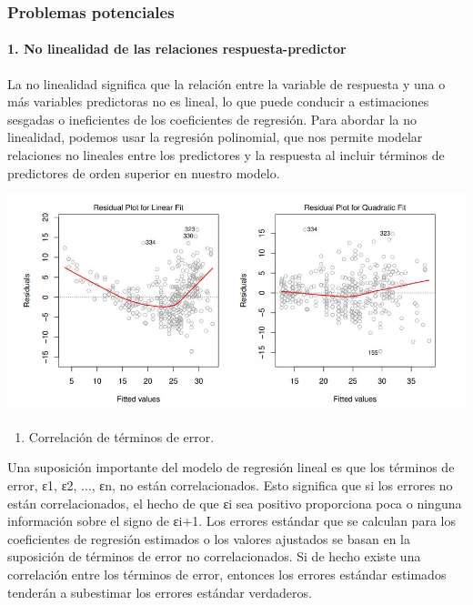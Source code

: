 \documentclass[
  letterpaper,
  DIV=11,
  numbers=noendperiod]{scrartcl}
\let\oldparagraph\paragraph
\renewcommand{\paragraph}[1]{\oldparagraph{#1}\mbox{}}
\providecommand{\tightlist}{%
  \setlength{\itemsep}{0pt}\setlength{\parskip}{0pt}}\usepackage{longtable,booktabs,array}
\begin{document}
\hypertarget{problemas-potenciales}{%
\subsubsection{Problemas potenciales}\label{problemas-potenciales}}

\hypertarget{no-linealidad-de-las-relaciones-respuesta-predictor}{%
\paragraph{1. No linealidad de las relaciones
respuesta-predictor}\label{no-linealidad-de-las-relaciones-respuesta-predictor}}

La no linealidad significa que la relación entre la variable de
respuesta y una o más variables predictoras no es lineal, lo que puede
conducir a estimaciones sesgadas o ineficientes de los coeficientes de
regresión. Para abordar la no linealidad, podemos usar la regresión
polinomial, que nos permite modelar relaciones no lineales entre los
predictores y la respuesta al incluir términos de predictores de orden
superior en nuestro modelo.

\includegraphics{images/jj.jpg}

\hypertarget{section-1}{%
\paragraph{}\label{section-1}}

\begin{enumerate}
\def\labelenumi{\arabic{enumi}.}
\setcounter{enumi}{1}
\tightlist
\item
  Correlación de términos de error.
\end{enumerate}

Una suposición importante del modelo de regresión lineal es que los
términos de error, ε1, ε2, ..., εn, no están correlacionados. Esto
significa que si los errores no están correlacionados, el hecho de que
εi sea positivo proporciona poca o ninguna información sobre el signo de
εi+1. Los errores estándar que se calculan para los coeficientes de
regresión estimados o los valores ajustados se basan en la suposición de
términos de error no correlacionados. Si de hecho existe una correlación
entre los términos de error, entonces los errores estándar estimados
tenderán a subestimar los errores estándar verdaderos.
\end{document}
